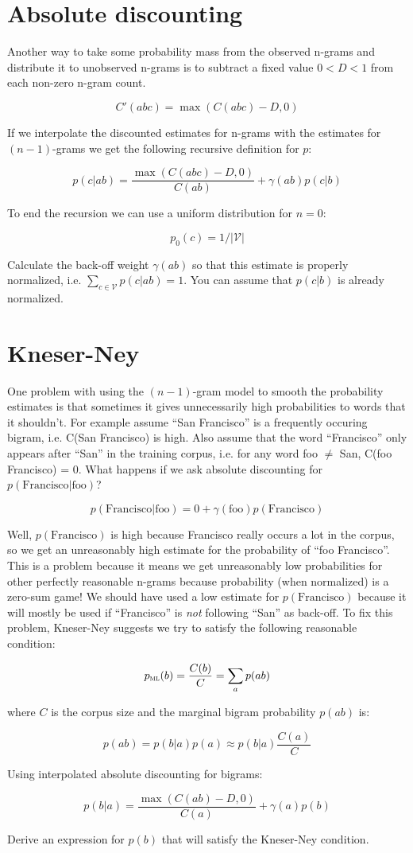 \documentclass[a4paper]{article}
\newcommand{\vocab}{\mathcal{V}}
\newcommand{\pml}{p_{\textsc{ml}}}
\begin{document}
\newpage
\section{Absolute discounting}

Another way to take some probability mass from the observed n-grams
and distribute it to unobserved n-grams is to subtract a fixed value
$0<D<1$ from each non-zero n-gram count.

\[ C'(abc) = \max(C(abc) - D, 0) \]

If we interpolate the discounted estimates for n-grams with
the estimates for $(n-1)$-grams we get the following recursive
definition for $p$:

\[ p(c|ab) = \frac{\max(C(abc) - D, 0)}{C(ab)} + \gamma(ab) p(c|b) \]

To end the recursion we can use a uniform distribution for $n=0$:

\[ p_0(c)=1/|\vocab| \]

Calculate the back-off weight $\gamma(ab)$ so that this estimate is
properly normalized, i.e. $\sum_{c\in\vocab} p(c|ab) = 1$.  You can
assume that $p(c|b)$ is already normalized.


\newpage
\section{Kneser-Ney}

One problem with using the $(n-1)$-gram model to smooth the
probability estimates is that sometimes it gives unnecessarily high
probabilities to words that it shouldn't.  For example assume ``San
Francisco'' is a frequently occuring bigram, i.e. C(San Francisco) is
high.  Also assume that the word ``Francisco'' only appears after
``San'' in the training corpus, i.e. for any word foo $\neq$ San,
C(foo Francisco) = 0.  What happens if we ask absolute discounting for
$p(\mbox{Francisco} | \mbox{foo})$?

\[ p(\mbox{Francisco} | \mbox{foo}) = 0 + \gamma(\mbox{foo})
p(\mbox{Francisco}) \]

Well, $p(\mbox{Francisco})$ is high because Francisco really occurs a
lot in the corpus, so we get an unreasonably high estimate for the
probability of ``foo Francisco''.  This is a problem because it means
we get unreasonably low probabilities for other perfectly reasonable
n-grams because probability (when normalized) is a zero-sum game!  We
should have used a low estimate for $p(\mbox{Francisco})$ because it
will mostly be used if ``Francisco'' is {\em not} following ``San'' as
back-off.  To fix this problem, Kneser-Ney suggests we try to satisfy
the following reasonable condition:

\[ \pml(b) = \frac{C(b)}{C} = \sum_a p(ab) \]

where $C$ is the corpus size and the marginal bigram probability
$p(ab)$ is:

\[ p(ab) = p(b|a) p(a) \approx p(b|a) \frac{C(a)}{C} \]

Using interpolated absolute discounting for bigrams:

\[ p(b|a) = \frac{\max(C(ab) - D, 0)}{C(a)} + \gamma(a) p(b) \]

Derive an expression for $p(b)$ that will satisfy the Kneser-Ney
condition.
\end{document}
